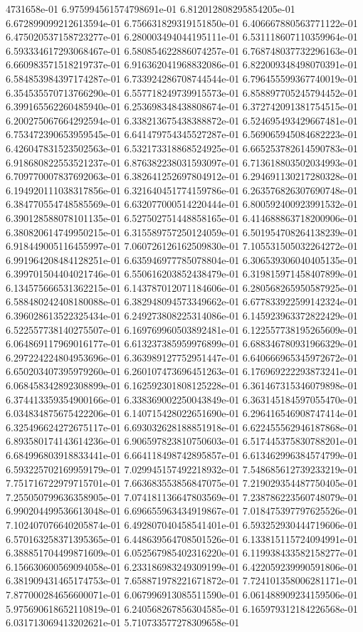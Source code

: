 4731658e-01	6.975994561574798691e-01	6.812012808295854205e-01	6.672899099212613594e-01	6.756631829319151850e-01	6.406667880563771122e-01	6.475020537158723277e-01	6.280003494044195111e-01	6.531118607110359964e-01	6.593334617293068467e-01	6.580854622886074257e-01	6.768748037732296163e-01	6.660983571518219737e-01	6.916362041968832086e-01	6.822009348498070391e-01	6.584853984397174287e-01	6.733924286708744544e-01	6.796455599367740019e-01	6.354535570713766290e-01	6.557718249739915573e-01	6.858897705245794452e-01	6.399165562260485940e-01	6.253698348438808674e-01	6.372742091381754515e-01	6.200275067664292594e-01	6.338213675438388872e-01	6.524695493429667481e-01	6.753472390653959545e-01	6.641479754345527287e-01	6.569065945084682223e-01	6.426047831523502563e-01	6.532173318868524925e-01	6.665253782614590783e-01	6.918680822553521237e-01	6.876382238031593097e-01	6.713618803502034993e-01	6.709770007837692063e-01	6.382641252697804912e-01	6.294691130217280328e-01	6.194920111038317856e-01	6.321640451774159786e-01	6.263576826307690748e-01	6.384770554748585569e-01	6.632077000514220444e-01	6.800592400923991532e-01	6.390128588078101135e-01	6.527502751448858165e-01	6.414688863718200906e-01	6.380820614749950215e-01	6.315589757250124059e-01	6.501954708264138239e-01	6.918449005116455997e-01	7.060726126162509830e-01	7.105531505032264272e-01	6.991964208484128251e-01	6.635946977785078804e-01	6.306539306040405135e-01	6.399701504404021746e-01	6.550616203852438479e-01	6.319815971458407899e-01	6.134575666531362215e-01	6.143787012071184606e-01	6.280568265950587925e-01	6.588480242408180088e-01	6.382948094573349662e-01	6.677833922599142324e-01	6.396028613522325434e-01	6.249273808225314086e-01	6.145923963372822429e-01	6.522557738140275507e-01	6.169769960503892481e-01	6.122557738195265609e-01	6.064869117969016177e-01	6.613237385959976899e-01	6.688346780931966329e-01	6.297224224804953696e-01	6.363989127752951447e-01	6.640666965345972672e-01	6.650203407395979260e-01	6.260107473696451263e-01	6.176969222293873241e-01	6.068458342892308899e-01	6.162592301808125228e-01	6.361467315346079898e-01	6.374413359354900166e-01	6.338369002250043849e-01	6.363145184597055470e-01	6.034834875675422206e-01	6.140715428022651690e-01	6.296416546908747414e-01	6.325496624272675117e-01	6.693032628188851918e-01	6.622455562946187868e-01	6.893580174143614236e-01	6.906597823810750603e-01	6.517445375830788201e-01	6.684996803918833441e-01	6.664118498742895857e-01	6.613462996384574799e-01	6.593225702169959179e-01	7.029945157492218932e-01	7.548685612739233219e-01	7.751716722979715701e-01	7.663683553856847075e-01	7.219029354487750405e-01	7.255050799636358905e-01	7.074181136647803569e-01	7.238786223560748079e-01	6.990204499536613048e-01	6.696655963434919867e-01	7.018475397797625526e-01	7.102407076640205874e-01	6.492807040458541401e-01	6.593252930444719606e-01	6.570163258371395365e-01	6.448639564708501526e-01	6.133815115724094991e-01	6.388851704499871609e-01	6.052567985402316220e-01	6.119938433582158277e-01	6.156630600569094058e-01	6.233186983249309199e-01	6.422059239990591806e-01	6.381909431465174753e-01	7.658871978221671872e-01	7.724101358006281171e-01	7.877000284656600071e-01	6.067996913085511590e-01	6.061488909234159506e-01	5.975690618652110819e-01	6.240568267856304585e-01	6.165979312184226568e-01	6.031713069413202621e-01	5.710733577278309658e-01